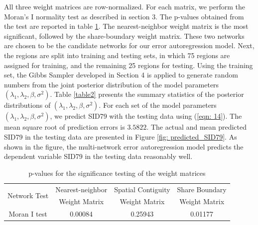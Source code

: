 \documentclass[times, doublespace]{auth}
\begin{document}
All three weight matrices are row-normalized. For each matrix, we perform the Moran's I normality test as described in section 3. The p-values obtained from the test are reported in table \ref{table1}. The nearest-neighbor weight matrix is the most significant, followed by the share-boundary weight matrix. These two networks are chosen to be the candidate networks for our error autoregression model. Next, the regions are split into training and testing sets, in which 75 regions are assigned for training, and the remaining 25 regions for testing. Using the training set, the Gibbs Sampler developed in Section 4 is applied to generate random numbers from the joint posterior distribution of the model parameters $(\lambda_{1}, \lambda_{2}, \beta, \sigma^{2})$. Table \ref{table2} presents the summary statistics of the posterior distributions of $(\lambda_{1}, \lambda_{2}, \beta, \sigma^{2})$. For each set of the model parameters $(\lambda_{1}, \lambda_{2}, \beta, \sigma^{2})$, we predict SID79 with the testing data using (\ref{eqn: 14}). The mean square root of prediction errors is $3.5822$. The actual and mean predicted SID79 in the testing data are presented in Figure \ref{fig: predicted_SID79}. As shown in the figure, the multi-network error autoregression model predicts the dependent variable SID79 in the testing data reasonably well.
\begin{table}
	\centering
	\caption{p-values for the significance testing of the weight matrices}
	\label{table1}
	\begin{tabular}{|c|c|c|c|}
		\hline
		\multirow{ 2}{*}{Network Test} & Nearest-neighbor & Spatial Contiguity & Share Boundary\\
		& Weight Matrix & Weight Matrix & Weight Matrix\\
		\hline
		Moran I test & 0.00084 & 0.25943 & 0.01177\\
		\hline
	\end{tabular}
\end{table}
\end{document}
